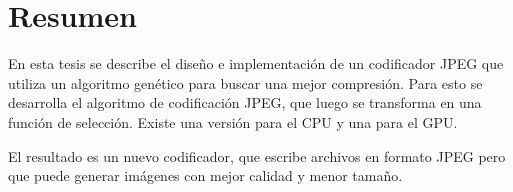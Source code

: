 \begingroup
\let\clearpage\relax
\let\cleardoublepage\relax
\let\cleardoublepage\relax

\chapter*{Resumen}

En esta tesis se describe el diseño e implementación de un codificador JPEG que
utiliza un algoritmo genético para buscar una mejor compresión. Para esto se
desarrolla el algoritmo de codificación JPEG, que luego se transforma en una
función de selección. Existe una versión para el CPU y una para el GPU.

El resultado es un nuevo codificador, que escribe archivos en formato JPEG pero
que puede generar imágenes con mejor calidad y menor tamaño.



\vfill

\endgroup

